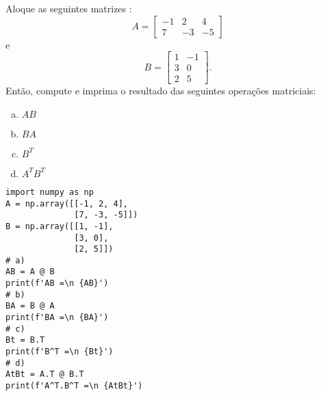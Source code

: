 \begin{exer}
  Aloque as seguintes matrizes {\PYTHONnumpyDOTarray}:
  \begin{equation}
    A =
    \begin{bmatrix}
        -1 & 2 & 4\\
        7 & -3 & -5
      \end{bmatrix}      
  \end{equation}
  e
  \begin{equation}
    B =
    \begin{bmatrix}
        1 & -1\\
        3 & 0\\
        2 & 5
      \end{bmatrix}.      
  \end{equation}
  Então, compute e imprima o resultado das seguintes operações matriciais:
  \begin{enumerate}[a)]
  \item $AB$
  \item $BA$
  \item $B^T$
  \item $A^TB^T$
  \end{enumerate}
\end{exer}
\begin{resp}

\begin{lstlisting}
import numpy as np
A = np.array([[-1, 2, 4],
              [7, -3, -5]])
B = np.array([[1, -1],
              [3, 0],
              [2, 5]])
# a)
AB = A @ B
print(f'AB =\n {AB}')
# b)
BA = B @ A
print(f'BA =\n {BA}')
# c)
Bt = B.T
print(f'B^T =\n {Bt}')
# d)
AtBt = A.T @ B.T
print(f'A^T.B^T =\n {AtBt}')
\end{lstlisting}

\end{resp}

